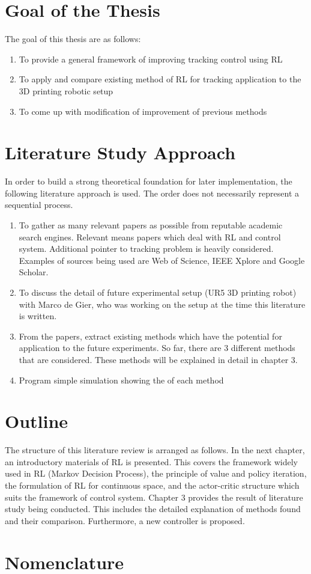 \section{Goal of the Thesis}

The goal of this thesis are as follows:
\begin{enumerate}
\item To provide a general framework of improving tracking control using RL
\item To apply and compare existing method of RL for tracking application to the 3D printing robotic setup
\item To come up with modification of improvement of previous methods
\end{enumerate}

\section{Literature Study Approach}
In order to build a strong theoretical foundation for later implementation, the following literature approach is used. The order does not necessarily represent a sequential process.
\begin{enumerate}
	\item To gather as many relevant papers as possible from reputable academic search engines. Relevant means papers which deal with RL and control system. Additional pointer to tracking problem is heavily considered. Examples of sources being used are Web of Science, IEEE Xplore and Google Scholar.
	\item To discuss the detail of future experimental setup (UR5 3D printing robot) with Marco de Gier, who was working on the setup at the time this literature is written.
	\item From the papers, extract existing methods which have the potential for application to the future experiments. So far, there are 3 different methods that are considered. These methods will be explained in detail in chapter 3.
	\item Program simple simulation showing the of each method
	
\end{enumerate}


\section{Outline}

The structure of this literature review is arranged as follows. In the next chapter, an introductory materials of RL is presented. This covers the framework widely used in RL (Markov Decision Process), the principle of value and policy iteration, the formulation of RL for continuous space, and the actor-critic structure which suits the framework of control system. Chapter 3 provides the result of literature study being conducted. This includes the detailed explanation of methods found and their comparison. Furthermore, a new controller is proposed. 

\section{Nomenclature}


